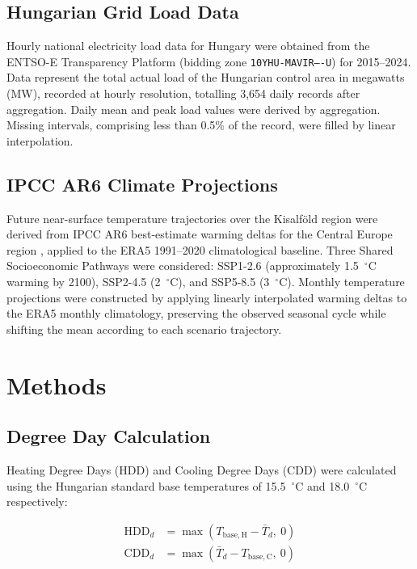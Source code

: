 \documentclass[11pt,a4paper]{article}
\newcommand{\HDD}{\mathrm{HDD}}
\newcommand{\CDD}{\mathrm{CDD}}
\begin{document}
\subsection{Hungarian Grid Load Data}
\label{sec:data_load}

Hourly national electricity load data for Hungary were obtained from
the ENTSO-E Transparency Platform \citep{entsoe}
(bidding zone \texttt{10YHU-MAVIR----U}) for 2015--2024.
Data represent the total actual load of the Hungarian control area
in megawatts (MW), recorded at hourly resolution, totalling 3,654
daily records after aggregation. Daily mean and peak load values
were derived by aggregation. Missing intervals, comprising less than
0.5\% of the record, were filled by linear interpolation.

\subsection{IPCC AR6 Climate Projections}
\label{sec:data_cmip6}

Future near-surface temperature trajectories over the Kisalf\"{o}ld
region were derived from IPCC AR6 best-estimate warming deltas for
the Central Europe region \citep{eyring2016cmip6}, applied to the
ERA5 1991--2020 climatological baseline. Three Shared Socioeconomic
Pathways were considered: SSP1-2.6 (approximately 1.5~$^\circ$C
warming by 2100), SSP2-4.5 (2~$^\circ$C), and SSP5-8.5
(3~$^\circ$C). Monthly temperature projections were constructed by
applying linearly interpolated warming deltas to the ERA5 monthly
climatology, preserving the observed seasonal cycle while shifting
the mean according to each scenario trajectory.

\section{Methods}
\label{sec:methods}

\subsection{Degree Day Calculation}
\label{sec:methods_dd}

Heating Degree Days (HDD) and Cooling Degree Days (CDD) were calculated
using the Hungarian standard base temperatures of 15.5~$^\circ$C
and 18.0~$^\circ$C respectively:

\begin{align}
  \HDD_d &= \max(T_\mathrm{base,H} - \bar{T}_d,\ 0) \label{eq:hdd} \\
  \CDD_d &= \max(\bar{T}_d - T_\mathrm{base,C},\ 0) \label{eq:cdd}
\end{align}
\end{document}
